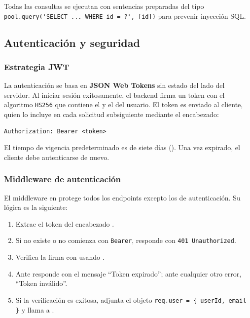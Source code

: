 Todas las consultas se ejecutan con sentencias preparadas del tipo
\lstinline[style=codigobase]{pool.query('SELECT ... WHERE id = ?', [id])}
para prevenir inyección SQL.

\subsection{Autenticación y seguridad}

\subsubsection{Estrategia JWT}

La autenticación se basa en \textbf{JSON Web Tokens} sin estado del
lado del servidor. Al iniciar sesión exitosamente, el backend firma un
token con el algoritmo \texttt{HS256} que contiene el
 y el  del usuario. El token es
enviado al cliente, quien lo incluye en cada solicitud
subsiguiente mediante el encabezado:

\begin{lstlisting}[style=codigobase, language={}]
Authorization: Bearer <token>
\end{lstlisting}

El tiempo de vigencia predeterminado es de siete días
(). Una vez expirado, el cliente debe
autenticarse de nuevo.

\subsubsection{Middleware de autenticación}

El middleware en  protege todos los
endpoints excepto los de autenticación. Su lógica es la siguiente:

\begin{enumerate}
  \item Extrae el token del encabezado .
  \item Si no existe o no comienza con \texttt{Bearer}, responde con
    \texttt{401 Unauthorized}.
  \item Verifica la firma con  usando
    .
  \item Ante  responde con el mensaje
    ``Token expirado''; ante cualquier otro error, ``Token inválido''.
  \item Si la verificación es exitosa, adjunta el objeto
    \lstinline[style=codigobase]|req.user = { userId, email }| y
    llama a .
\end{enumerate}

